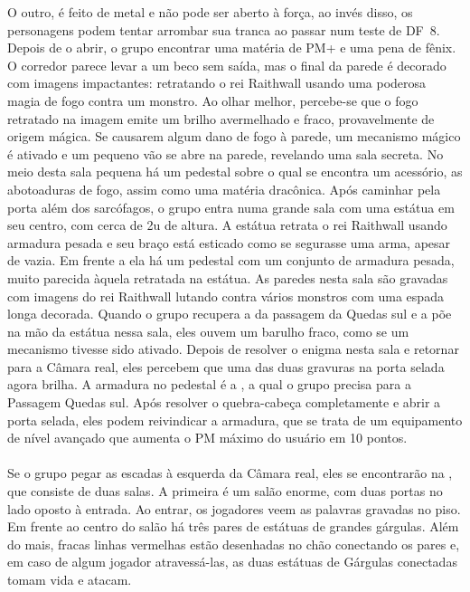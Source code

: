 O outro, é feito de metal e não pode ser aberto à força, ao invés disso, os personagens podem tentar arrombar sua tranca ao passar num teste de DF~8.
Depois de o abrir, o grupo encontrar uma matéria de PM+ e uma pena de fênix.
O corredor parece levar a um beco sem saída, mas o final da parede é decorado com imagens impactantes: retratando o rei Raithwall usando uma poderosa magia de fogo contra um monstro.
Ao olhar melhor, percebe-se que o fogo retratado na imagem emite um brilho avermelhado e fraco, provavelmente de origem mágica.
Se causarem algum dano de fogo à parede, um mecanismo mágico é ativado e um pequeno vão se abre na parede, revelando uma sala secreta.
No meio desta sala pequena há um pedestal sobre o qual se encontra um acessório, as abotoaduras de fogo, assim como uma matéria dracônica.
%
\vfill
%
Após caminhar pela porta além dos sarcófagos, o grupo entra numa grande sala com uma estátua em seu centro, com cerca de 2u de altura.
A estátua retrata o rei Raithwall usando armadura pesada e seu braço está esticado como se segurasse uma arma, apesar de vazia.
Em frente a ela há um pedestal com um conjunto de armadura pesada, muito parecida àquela retratada na estátua.
As paredes nesta sala são gravadas com imagens do rei Raithwall lutando contra vários monstros com uma espada longa decorada.
Quando o grupo recupera a  da passagem da Quedas sul e a põe na mão da estátua nessa sala, eles ouvem um barulho fraco, como se um mecanismo tivesse sido ativado.
Depois de resolver o enigma nesta sala e retornar para a Câmara real, eles percebem que uma das duas gravuras na porta selada agora brilha.
A armadura no pedestal é a , a qual o grupo precisa para a Passagem Quedas sul.
Após resolver o quebra-cabeça completamente e abrir a porta selada, eles podem reivindicar a armadura, que se trata de um equipamento de nível avançado que aumenta o PM máximo do usuário em 10 pontos.
%
\newpage
%
\\\\
%
Se o grupo pegar as escadas à esquerda da Câmara real, eles se encontrarão na , que consiste de duas salas.
A primeira é um salão enorme, com duas portas no lado oposto à entrada.
Ao entrar, os jogadores veem as palavras  gravadas no piso.
Em frente ao centro do salão há três pares de estátuas de grandes gárgulas. Além do mais, fracas linhas vermelhas estão desenhadas no chão conectando os pares e, em caso de algum jogador atravessá-las, as duas estátuas de Gárgulas conectadas tomam vida e atacam.
